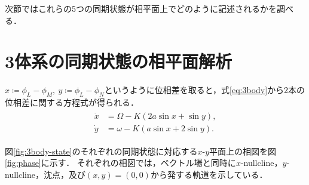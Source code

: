 \documentclass[../main]{subfiles}
\begin{document}
次節ではこれらの5つの同期状態が相平面上でどのように記述されるかを調べる．
\section{3体系の同期状態の相平面解析}
\label{sec:3body-phase-plane}
$x\coloneqq \phi_L-\phi_M,\ y\coloneqq\phi_L-\phi_N$というように位相差を取ると，式\eqref{eq:3body}から2本の位相差に関する方程式が得られる．
\begin{align}
    \label{eq:phase-diff}
    \begin{split}
    \dot{x}&=\Omega-K(2a\sin x+\sin y),\\
    \dot{y}&=\omega-K(a\sin x+2\sin y).
    \end{split}
\end{align}

図\ref{fig:3body-state}のそれぞれの同期状態に対応する$x$-$y$平面上の相図を図\ref{fig:phase}に示す．
それぞれの相図では，ベクトル場と同時に$x$-nullcline，$y$-nullcline，沈点，及び$(x,y)=(0,0)$から発する軌道を示している．
\end{document}
